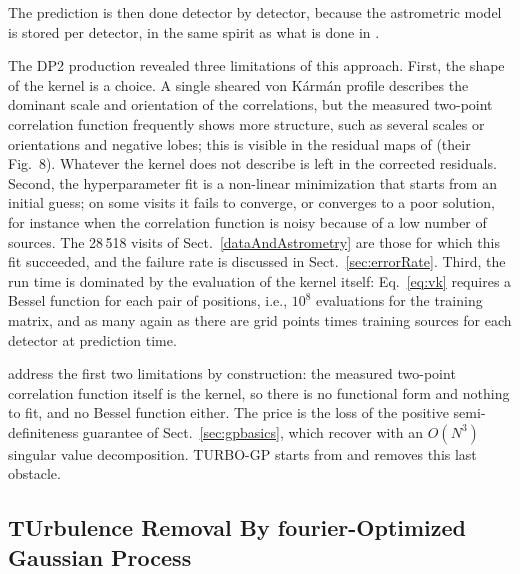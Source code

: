 The prediction is then done detector by detector, because the astrometric model is stored per detector, in the same spirit as what is done in .

The DP2 production revealed three limitations of this approach.
First, the shape of the kernel is a choice.
A single sheared von K\'arm\'an profile describes the dominant scale and orientation of the correlations, but the measured two-point correlation 
function frequently shows more structure, such as several scales or orientations and negative lobes; this is visible in the residual 
maps of  (their Fig.~8).
Whatever the kernel does not describe is left in the corrected residuals.
Second, the hyperparameter fit is a non-linear minimization that starts from an initial guess; on some visits it fails to converge, or 
converges to a poor solution, for instance when the correlation function is noisy because of a low number of sources.
The 28\,518 visits of Sect.~\ref{dataAndAstrometry} are those for which this fit succeeded, and the failure rate is discussed in Sect.~\ref{sec:errorRate}.
Third, the run time is dominated by the evaluation of the kernel itself: Eq.~\ref{eq:vk} requires a Bessel function for 
each pair of positions, i.e., $10^8$ evaluations for the training matrix, and as many again as there are grid points times 
training sources for each detector at prediction time.

 address the first two limitations by construction: the measured two-point correlation function 
itself is the kernel, so there is no functional form and nothing to fit, and no Bessel function either.
The price is the loss of the positive semi-definiteness guarantee of Sect.~\ref{sec:gpbasics}, which  
recover with an $O(N^3)$ singular value decomposition.
TURBO-GP starts from  and removes this last obstacle.

\subsection{TUrbulence Removal By fourier-Optimized Gaussian Process}
\label{sec:turbogp}


